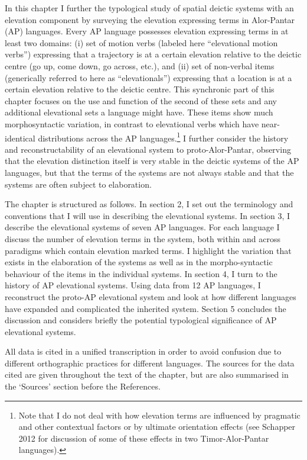 In this chapter I further the typological study of spatial deictic systems with an elevation component by surveying the elevation expressing terms in Alor-Pantar (AP) languages. Every AP language possesses elevation expressing terms in at least two domains: (i) set of motion verbs (labeled here {\textquotedblleft}elevational motion verbs{\textquotedblright}) expressing that a trajectory is at a certain elevation relative to the deictic centre (go up, come down, go across, etc.), and (ii) set of non-verbal items (generically referred to here as {\textquotedblleft}elevationals{\textquotedblright}) expressing that a location is at a certain elevation relative to the deictic centre. This synchronic part of this chapter focuses on the use and function of the second of these sets and any additional elevational sets a language might have. These items show much morphosyntactic variation, in contrast to elevational verbs which have near-identical distributions across the AP languages.\footnote{Note that I do not deal 
with how elevation terms are influenced by pragmatic and other contextual factors or by ultimate orientation effects (see Schapper 2012 for discussion of some of these effects in two Timor-Alor-Pantar languages).} I further consider the history and reconstructability of an elevational system to proto-Alor-Pantar, observing that the elevation distinction itself is very stable in the deictic systems of the AP languages, but that the terms of the systems are not always stable and that the systems are often subject to elaboration. 

The chapter is structured as follows. In section 2, I set out the terminology and conventions that I will use in describing the elevational systems. In section 3, I describe the elevational systems of seven AP languages. For each language I discuss the number of elevation terms in the system, both within and across paradigms which contain elevation marked terms. I highlight the variation that exists in the elaboration of the systems as well as in the morpho-syntactic behaviour of the items in the individual systems. In section 4, I turn to the history of AP elevational systems. Using data from 12 AP languages, I reconstruct the proto-AP elevational system and look at how different languages have expanded and complicated the inherited system. Section 5 concludes the discussion and considers briefly the potential typological significance of AP elevational systems.

All data is cited in a unified transcription in order to avoid confusion due to different orthographic practices for different languages. The sources for the data cited are given throughout the text of the chapter, but are also summarised in the {\textquoteleft}Sources{\textquoteright} section before the References. 

